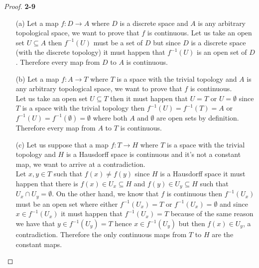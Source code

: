 \documentclass[11pt]{article}
\theoremstyle{definition}
\begin{document}
\begin{proof}{\textbf{2-9}}
\begin{itemize}
    \item [(a)] Let a map $f:D \to A$ where $D$ is a discrete space and $A$
    is any arbitrary topological space, we want to prove
    that $f$ is continuous.
    Let us take an open set $U \subseteq A$ then $f^{-1}(U)$ must be a 
    set of $D$ but since $D$ is a discrete space (with the discrete topology)
    it must happen that $f^{-1}(U)$ is an open set of $D$. Therefore every map
    from $D$ to $A$ is continuous.

    \item [(b)] Let a map $f: A \to T$ where $T$ is a space with the trivial
    topology and $A$ is any arbitrary topological space, we want to prove
    that $f$ is continuous.\\
    Let us take an open set $U \subseteq T$ then it must happen that $U = T$
    or $U = \emptyset$ since $T$ is a space with the trivial topology
    then $f^{-1}(U) = f^{-1}(T) = A$ or
    $f^{-1}(U) = f^{-1}(\emptyset) = \emptyset$ where both $A$ and $\emptyset$
    are open sets by definition. Therefore every map from $A$ to $T$ is
    continuous.

    \item [(c)] Let us suppose that a map $f: T \to H$ where $T$ is a space
    with the trivial topology and $H$ is a Hausdorff space
    is continuous and it's not a constant map, we want to arrive
    at a contradiction.\\
    Let $x,y \in T$ such that $f(x) \neq f(y)$ since $H$ is a Hausdorff space
    it must happen that there is $f(x) \in U_x \subseteq H$ and
    $f(y) \in U_y \subseteq H$ such that $U_x \cap U_y = \emptyset$.
    On the other hand, we know that $f$ is continuous then $f^{-1}(U_x)$
    must be an open set where either $f^{-1}(U_x) = T$ or
    $f^{-1}(U_x) = \emptyset$ and since $x \in f^{-1}(U_x)$ it must happen
    that $f^{-1}(U_x) = T$ because of the same reason we have that
    $y \in f^{-1}(U_y) = T$ hence $x \in f^{-1}(U_y)$ but then $f(x) \in U_y$,
    a contradiction.
    Therefore the only continuous maps from $T$ to $H$ are the constant maps.
\end{itemize}
\end{proof}
\cleardoublepage
\end{document}
